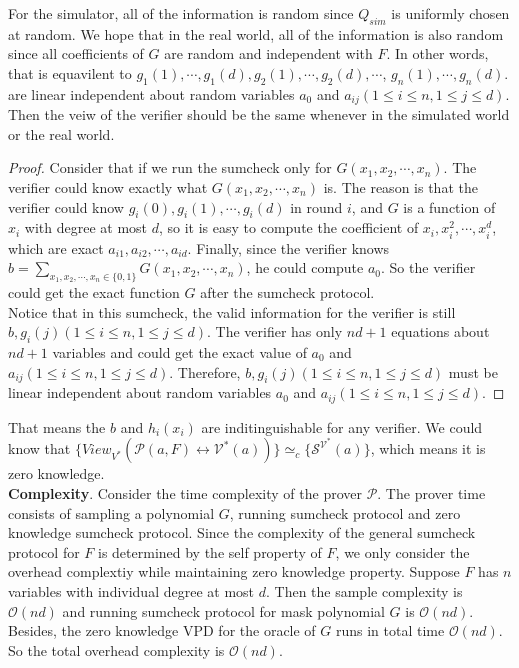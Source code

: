 For the simulator, all of the information is random since $Q_{sim}$ is uniformly chosen at random. We hope that in the real world, all of the information is also random since all coefficients of $G$ are random and independent with $F$. In other words, that is equavilent to $g_{1}(1), \cdots, g_{1}(d), g_{2}(1), \cdots, g_2(d), \cdots$, $g_{n}(1), \cdots, g_{n}(d)$. are linear independent about random variables $a_0$ and $a_{ij}(1 \leq i \leq n, 1 \leq j \leq d)$. Then the veiw of the verifier should be the same whenever in the simulated world or the real world. 

\begin{proof}
Consider that if we run the sumcheck only for $G(x_1, x_2, \cdots, x_n)$. The verifier could know exactly what $G(x_1, x_2, \cdots, x_n)$ is. The reason is that the verifier could know $g_{i}(0), g_{i}(1), \cdots, g_{i}(d)$ in round $i$, and $G$ is a function of $x_i$ with degree at most $d$, so it is easy to compute the coefficient of $x_i, x^2_i, \cdots, x^d_i$, which are exact $a_{i1}, a_{i2}, \cdots, a_{id}$. Finally, since the verifier knows $b = \sum\limits_{x_1, x_2, \cdots, x_n \in \{0, 1\}}G(x_1, x_2, \cdots, x_n)$, he could compute $a_0$. So the verifier could get the exact function $G$ after the sumcheck protocol.\\  

Notice that in this sumcheck, the valid information for the verifier is still $b, g_i(j)(1 \leq i \leq n, 1 \leq j \leq d)$. The verifier has only $nd + 1$ equations about $nd + 1$ variables and could get the exact value of $a_0$ and $a_{ij}(1 \leq i \leq n, 1 \leq j \leq d)$. Therefore, $b, g_i(j)(1 \leq i \leq n, 1 \leq j \leq d)$ must be linear independent about random variables $a_0$ and $a_{ij}(1 \leq i \leq n, 1 \leq j \leq d)$.
\end{proof}

That means the $b$ and $h_i(x_i)$ are inditinguishable for any verifier. We could know that $\{View_{V^*}(\mathcal{P}(a, F) \leftrightarrow \mathcal{V^*}(a))\} \simeq_{c} \{\mathcal{S}^{\mathcal{V^*}}(a)\}$, which means it is zero knowledge.\\

\noindent
\textbf{Complexity}. Consider the time complexity of the prover $\mathcal{P}$. The prover time consists of sampling a polynomial $G$, running sumcheck protocol and zero knowledge sumcheck protocol. Since the complexity of the general sumcheck protocol for $F$ is determined by the self property of $F$, we only consider the overhead complextiy while maintaining zero knowledge property. Suppose $F$ has $n$ variables with individual degree at most $d$. Then the sample complexity is $\mathcal{O}(nd)$ and running sumcheck protocol for mask polynomial $G$ is $\mathcal{O}(nd)$. Besides, the zero knowledge VPD for the oracle of $G$ runs in total time $\mathcal{O}(nd)$. So the total overhead complexity is $\mathcal{O}(nd)$.  

